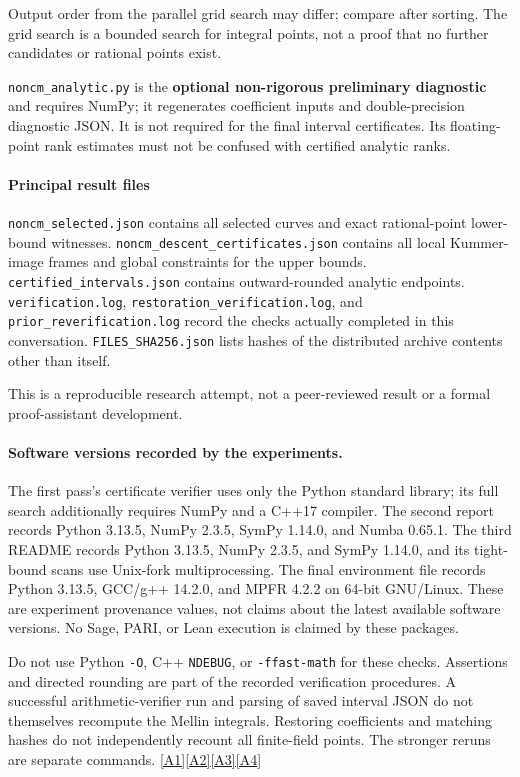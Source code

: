 \documentclass[11pt]{article}
\newcommand{\srcref}[1]{\hyperlink{source:#1}{[#1]}}
\begin{document}
Output order from the parallel grid search may differ; compare after sorting. The grid search is a bounded search for integral points, not a proof that no further candidates or rational points exist.

\nolinkurl{noncm_analytic.py} is the \textbf{optional non-rigorous preliminary diagnostic} and requires NumPy; it regenerates coefficient inputs and double-precision diagnostic JSON. It is not required for the final interval certificates. Its floating-point rank estimates must not be confused with certified analytic ranks.

\paragraph{Principal result files}

\nolinkurl{noncm_selected.json} contains all selected curves and exact rational-point lower-bound witnesses. \nolinkurl{noncm_descent_certificates.json} contains all local Kummer-image frames and global constraints for the upper bounds. \nolinkurl{certified_intervals.json} contains outward-rounded analytic endpoints. \nolinkurl{verification.log}, \nolinkurl{restoration_verification.log}, and \nolinkurl{prior_reverification.log} record the checks actually completed in this conversation. \nolinkurl{FILES_SHA256.json} lists hashes of the distributed archive contents other than itself.

This is a reproducible research attempt, not a peer-reviewed result or a formal proof-assistant development.
\paragraph{Software versions recorded by the experiments.}
The first pass's certificate verifier uses only the Python standard library;
its full search additionally requires NumPy and a C++17 compiler. The second
report records Python 3.13.5, NumPy 2.3.5, SymPy 1.14.0, and Numba 0.65.1.
The third README records Python 3.13.5, NumPy 2.3.5, and SymPy 1.14.0, and its
tight-bound scans use Unix-fork multiprocessing. The final environment file
records Python 3.13.5, GCC/g++ 14.2.0, and MPFR 4.2.2 on 64-bit GNU/Linux.
These are experiment provenance values, not claims about the latest available
software versions. No Sage, PARI, or Lean execution is claimed by these packages.

Do not use Python \nolinkurl{-O}, C++ \nolinkurl{NDEBUG}, or
\nolinkurl{-ffast-math} for these checks. Assertions and directed rounding are
part of the recorded verification procedures. A successful arithmetic-verifier
run and parsing of saved interval JSON do not themselves recompute the Mellin
integrals. Restoring coefficients and matching hashes do not independently
recount all finite-field points. The stronger reruns are separate commands.
\srcref{A1}\srcref{A2}\srcref{A3}\srcref{A4}
\end{document}
